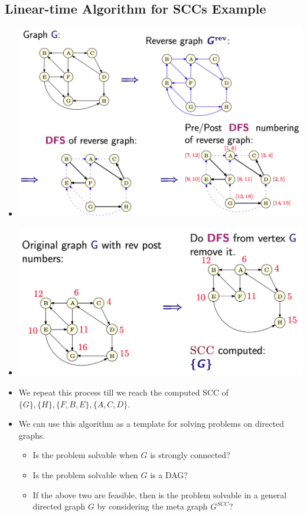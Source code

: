 \documentclass[12pt]{article}
\begin{document}
\subsection{Linear-time Algorithm for SCCs Example}
\begin{itemize}
    \item[] \includegraphics[width=\textwidth]{images/linear-scc-algorithm-visualization.jpg}
    \item[] \includegraphics[width=\textwidth]{images/linear-scc-algorithm-visualization-2.jpg}
    \item We repeat this process till we reach the computed SCC of $\{ G \}, \{ H \}, \{ F, B, E \}, \{ A, C, D \}$.
    \item We can use this algorithm as a template for solving problems on directed graphs.
    \begin{itemize}
        \item Is the problem solvable when $G$ is strongly connected?
        \item Is the problem solvable when $G$ is a DAG?
        \item If the above two are feasible, then is the problem solvable in a general directed graph $G$ by considering the meta graph $G^{SCC}$?
    \end{itemize}
\end{itemize}
\end{document}
